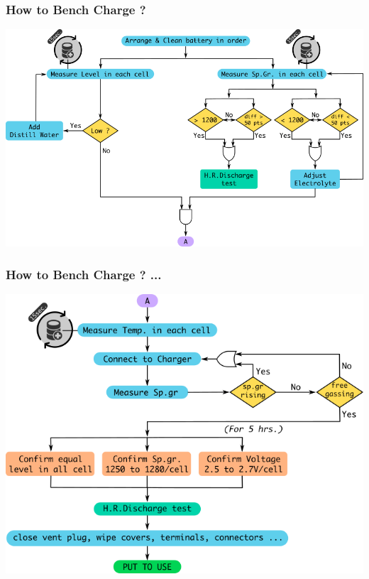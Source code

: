 \documentclass{beamer}
\begin{document}
\begin{frame}     %
  \frametitle{How to Bench Charge ?}
  \fontsize{8pt}{10}\selectfont
  \begin{center}
    \includegraphics[width=\linewidth]{./Resources/Images/instructions_benchcharge_1.png}
  \end{center}
\end{frame}

\begin{frame}     %
  \frametitle{How to Bench Charge ? ...}
  \fontsize{8pt}{10}\selectfont
  \begin{center}
    \includegraphics[width=0.85\linewidth]{./Resources/Images/instructions_benchcharge_2.png}
  \end{center}
\end{frame}
\end{document}
